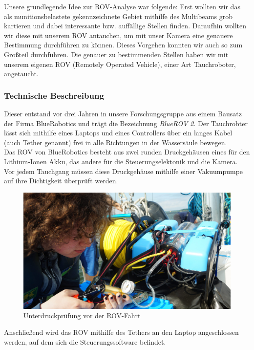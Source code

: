 
Unsere grundlegende Idee zur ROV-Analyse war folgende: Erst wollten wir das als munitionsbelastete gekennzeichnete Gebiet mithilfe 
des Multibeams grob kartieren und dabei 
interessante bzw. auffällige Stellen finden. Daraufhin wollten wir diese mit unserem ROV antauchen, um mit unser Kamera eine genauere Bestimmung durchführen zu können. 
Dieses Vorgehen konnten wir auch so zum Großteil durchführen.
Die genauer zu bestimmenden Stellen haben wir mit unserem eigenen ROV (Remotely Operated Vehicle), einer Art Tauchroboter, angetaucht. 
\subsubsection{Technische Beschreibung}
Dieser entstand vor drei Jahren in unsere Forschungsgruppe aus einem Bausatz der Firma BlueRobotics und trägt die Bezeichnung \emph{BlueROV 2}.
Der Tauchrobter lässt sich mithilfe eines Laptops und eines Controllers über ein langes Kabel (auch Tether genannt) frei in alle Richtungen in der Wassersäule bewegen.\\
Das ROV von BlueRobotics besteht aus zwei runden Druckgehäusen eines für den Lithium-Ionen Akku, das andere für die Steuerungselektonik und die Kamera.
Vor jedem Tauchgang müssen diese Druckgehäuse mithilfe einer Vakuumpumpe auf ihre Dichtigkeit überprüft werden. 
\begin{figure}[htb!]
\includegraphics[height=\textheight,%
                   width=\textwidth,%
                   keepaspectratio]{Bilder/ROV/Druckpruefung.jpg}
\caption{Unterdruckprüfung vor der ROV-Fahrt}
\end{figure}
Anschließend wird das ROV mithilfe des Tethers an den Laptop angeschlossen werden, auf dem sich die Steuerungssoftware befindet.
